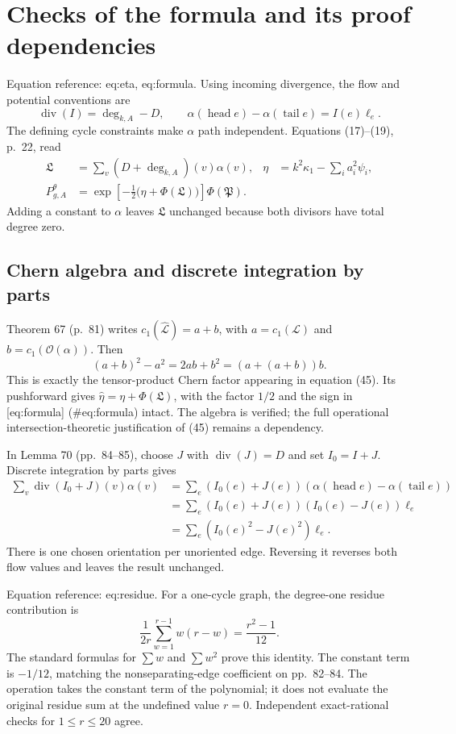 \documentclass[10pt]{article}
\begin{document}
\section*{Checks of the formula and its proof dependencies}
Equation reference: eq:eta, eq:formula. Using incoming divergence, the flow and potential conventions are \[\operatorname{div}(I)=\deg_{k,A}-D,\qquad
 \alpha(\operatorname{head}e)-\alpha(\operatorname{tail}e)=I(e)\ell_e.\] The defining cycle constraints make \(\alpha\) path independent. Equations (17)–(19), p. 22, read \[\begin{aligned}
 \mathfrak L&=\sum_v(D+\deg_{k,A})(v)\alpha(v),&
 \eta&=k^2\kappa_1-\sum_i a_i^2\psi_i,\\
 P^\theta_{g,A}
 &=\exp\!\left[-\tfrac12\bigl(\eta+\Phi(\mathfrak L)\bigr)\right]
       \Phi(\mathfrak P).\end{aligned}\] Adding a constant to \(\alpha\) leaves \(\mathfrak L\) unchanged because both divisors have total degree zero.\par
\subsection*{Chern algebra and discrete integration by parts}
Theorem 67 (p. 81) writes \(c_1(\widehat{\mathcal L})=a+b\), with \(a=c_1(\mathcal L)\) and \(b=c_1(\mathcal O(\alpha))\). Then \[(a+b)^2-a^2=2ab+b^2=(a+(a+b))b.\] This is exactly the tensor-product Chern factor appearing in equation (45). Its pushforward gives \(\widehat\eta=\eta+\Phi(\mathfrak L)\), with the factor \(1/2\) and the sign in [eq:formula] (\#eq:formula) intact. The algebra is verified; the full operational intersection-theoretic justification of (45) remains a dependency.\par
In Lemma 70 (pp. 84–85), choose \(J\) with \(\operatorname{div}(J)=D\) and set \(I_0=I+J\). Discrete integration by parts gives \[\begin{aligned}
 \sum_v\operatorname{div}(I_0+J)(v)\alpha(v)
 &=\sum_e(I_0(e)+J(e))(\alpha(\operatorname{head}e)-\alpha(\operatorname{tail}e))\\
 &=\sum_e(I_0(e)+J(e))(I_0(e)-J(e))\ell_e\\
 &=\sum_e(I_0(e)^2-J(e)^2)\ell_e .\end{aligned}\] There is one chosen orientation per unoriented edge. Reversing it reverses both flow values and leaves the result unchanged.\par
Equation reference: eq:residue. For a one-cycle graph, the degree-one residue contribution is \[
 \frac1{2r}\sum_{w=1}^{r-1}w(r-w)=\frac{r^2-1}{12}.\] The standard formulas for \(\sum w\) and \(\sum w^2\) prove this identity. The constant term is \(-1/12\), matching the nonseparating-edge coefficient on pp. 82–84. The operation takes the constant term of the polynomial; it does not evaluate the original residue sum at the undefined value \(r=0\). Independent exact-rational checks for \(1\le r\le20\) agree.\par
\end{document}
